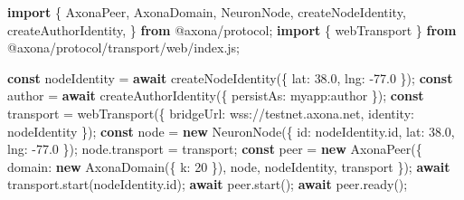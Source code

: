 \documentclass[
  nobib]{tufte-handout}
\newenvironment{Shaded}{}{}
\newcommand{\AttributeTok}[1]{\textcolor[rgb]{0.49,0.56,0.16}{#1}}
\newcommand{\ControlFlowTok}[1]{\textcolor[rgb]{0.00,0.44,0.13}{\textbf{#1}}}
\newcommand{\DataTypeTok}[1]{\textcolor[rgb]{0.56,0.13,0.00}{#1}}
\newcommand{\DecValTok}[1]{\textcolor[rgb]{0.25,0.63,0.44}{#1}}
\newcommand{\FloatTok}[1]{\textcolor[rgb]{0.25,0.63,0.44}{#1}}
\newcommand{\FunctionTok}[1]{\textcolor[rgb]{0.02,0.16,0.49}{#1}}
\newcommand{\ImportTok}[1]{\textcolor[rgb]{0.00,0.50,0.00}{\textbf{#1}}}
\newcommand{\KeywordTok}[1]{\textcolor[rgb]{0.00,0.44,0.13}{\textbf{#1}}}
\newcommand{\NormalTok}[1]{#1}
\newcommand{\OperatorTok}[1]{\textcolor[rgb]{0.40,0.40,0.40}{#1}}
\newcommand{\StringTok}[1]{\textcolor[rgb]{0.25,0.44,0.63}{#1}}
\begin{document}
\begin{Shaded}
\begin{Highlighting}[]
\ImportTok{import}\NormalTok{ \{}
\NormalTok{  AxonaPeer}\OperatorTok{,}\NormalTok{ AxonaDomain}\OperatorTok{,}\NormalTok{ NeuronNode}\OperatorTok{,}
\NormalTok{  createNodeIdentity}\OperatorTok{,}\NormalTok{ createAuthorIdentity}\OperatorTok{,}
\NormalTok{\} }\ImportTok{from} \StringTok{\textquotesingle{}@axona/protocol\textquotesingle{}}\OperatorTok{;}
\ImportTok{import}\NormalTok{ \{ webTransport \} }\ImportTok{from} \StringTok{\textquotesingle{}@axona/protocol/transport/web/index.js\textquotesingle{}}\OperatorTok{;}

\KeywordTok{const}\NormalTok{ nodeIdentity }\OperatorTok{=} \ControlFlowTok{await} \FunctionTok{createNodeIdentity}\NormalTok{(\{ }\DataTypeTok{lat}\OperatorTok{:} \FloatTok{38.0}\OperatorTok{,} \DataTypeTok{lng}\OperatorTok{:} \OperatorTok{{-}}\FloatTok{77.0}\NormalTok{ \})}\OperatorTok{;}
\KeywordTok{const}\NormalTok{ author       }\OperatorTok{=} \ControlFlowTok{await} \FunctionTok{createAuthorIdentity}\NormalTok{(\{ }\DataTypeTok{persistAs}\OperatorTok{:} \StringTok{\textquotesingle{}myapp:author\textquotesingle{}}\NormalTok{ \})}\OperatorTok{;}
\KeywordTok{const}\NormalTok{ transport    }\OperatorTok{=} \FunctionTok{webTransport}\NormalTok{(\{ }\DataTypeTok{bridgeUrl}\OperatorTok{:} \StringTok{\textquotesingle{}wss://testnet.axona.net\textquotesingle{}}\OperatorTok{,}
                                    \DataTypeTok{identity}\OperatorTok{:}\NormalTok{ nodeIdentity \})}\OperatorTok{;}
\KeywordTok{const}\NormalTok{ node }\OperatorTok{=} \KeywordTok{new} \FunctionTok{NeuronNode}\NormalTok{(\{ }\DataTypeTok{id}\OperatorTok{:}\NormalTok{ nodeIdentity}\OperatorTok{.}\AttributeTok{id}\OperatorTok{,} \DataTypeTok{lat}\OperatorTok{:} \FloatTok{38.0}\OperatorTok{,} \DataTypeTok{lng}\OperatorTok{:} \OperatorTok{{-}}\FloatTok{77.0}\NormalTok{ \})}\OperatorTok{;}
\NormalTok{node}\OperatorTok{.}\AttributeTok{transport} \OperatorTok{=}\NormalTok{ transport}\OperatorTok{;}
\KeywordTok{const}\NormalTok{ peer }\OperatorTok{=} \KeywordTok{new} \FunctionTok{AxonaPeer}\NormalTok{(\{ }\DataTypeTok{domain}\OperatorTok{:} \KeywordTok{new} \FunctionTok{AxonaDomain}\NormalTok{(\{ }\DataTypeTok{k}\OperatorTok{:} \DecValTok{20}\NormalTok{ \})}\OperatorTok{,}
\NormalTok{                             node}\OperatorTok{,}\NormalTok{ nodeIdentity}\OperatorTok{,}\NormalTok{ transport \})}\OperatorTok{;}
\ControlFlowTok{await}\NormalTok{ transport}\OperatorTok{.}\FunctionTok{start}\NormalTok{(nodeIdentity}\OperatorTok{.}\AttributeTok{id}\NormalTok{)}\OperatorTok{;}
\ControlFlowTok{await}\NormalTok{ peer}\OperatorTok{.}\FunctionTok{start}\NormalTok{()}\OperatorTok{;}
\ControlFlowTok{await}\NormalTok{ peer}\OperatorTok{.}\FunctionTok{ready}\NormalTok{()}\OperatorTok{;}
\end{Highlighting}
\end{Shaded}
\end{document}
